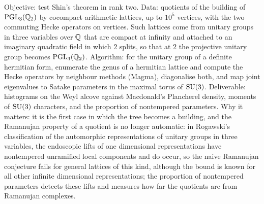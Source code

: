 \begin{compproblem}
Objective: test Shin's theorem in rank two. Data: quotients of the building of $\mathrm{PGL}_3(\mathbb{Q}_2)$ by cocompact arithmetic lattices, up to $10^5$ vertices, with the two commuting Hecke operators on vertices. Such lattices come from unitary groups in three variables over $\mathbb{Q}$ that are compact at infinity and attached to an imaginary quadratic field in which $2$ splits, so that at $2$ the projective unitary group becomes $\mathrm{PGL}_3(\mathbb{Q}_2)$. Algorithm: for the unitary group of a definite hermitian form, enumerate the genus of a hermitian lattice and compute the Hecke operators by neighbour methods (Magma), diagonalise both, and map joint eigenvalues to Satake parameters in the maximal torus of $\mathrm{SU}(3)$. Deliverable: histograms on the Weyl alcove against Macdonald's Plancherel density, moments of $\mathrm{SU}(3)$ characters, and the proportion of nontempered parameters. Why it matters: it is the first case in which the tree becomes a building, and the Ramanujan property of a quotient is no longer automatic: in Rogawski's classification of the automorphic representations of unitary groups in three variables, the endoscopic lifts of one dimensional representations have nontempered unramified local components and do occur, so the naive Ramanujan conjecture fails for general lattices of this kind, although the bound is known for all other infinite dimensional representations; the proportion of nontempered parameters detects these lifts and measures how far the quotients are from Ramanujan complexes.
\end{compproblem}
